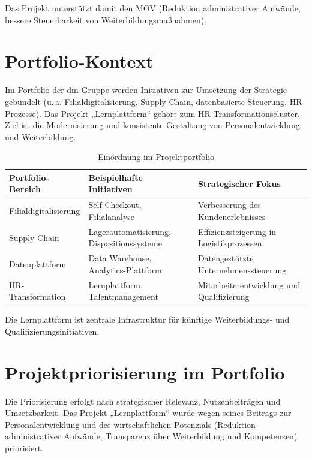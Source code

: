 Das Projekt unterstützt damit den \ac{MOV} (Reduktion administrativer Aufwände, bessere Steuerbarkeit von Weiterbildungsmaßnahmen).

\section{Portfolio-Kontext}

Im Portfolio der dm-Gruppe werden Initiativen zur Umsetzung der Strategie gebündelt (u.\,a. Filialdigitalisierung, Supply Chain, datenbasierte Steuerung, \ac{HR}-Prozesse). Das Projekt „Lernplattform“ gehört zum \ac{HR}-Transformationscluster. Ziel ist die Modernisierung und konsistente Gestaltung von Personalentwicklung und Weiterbildung.

\begin{xltabular}{\textwidth}{@{}lXX@{}}
    \caption{Einordnung im Projektportfolio} \label{tab:portfolio-einordnung} \\
    \hline
    \textbf{Portfolio-Bereich} & \textbf{Beispielhafte Initiativen}        & \textbf{Strategischer Fokus}              \\
    \hline
    Filialdigitalisierung      & Self-Checkout, Filialanalyse              & Verbesserung des Kundenerlebnisses        \\

    Supply Chain               & Lagerautomatisierung, Dispositionssysteme & Effizienzsteigerung in Logistikprozessen  \\

    Datenplattform             & Data Warehouse, Analytics-Plattform       & Datengestützte Unternehmenssteuerung      \\

    \ac{HR}-Transformation      & Lernplattform, Talentmanagement           & Mitarbeiterentwicklung und Qualifizierung \\
    \hline
\end{xltabular}

Die Lernplattform ist zentrale Infrastruktur für künftige Weiterbildungs- und Qualifizierungsinitiativen.

\section{Projektpriorisierung im Portfolio}

Die Priorisierung erfolgt nach strategischer Relevanz, Nutzenbeiträgen und Umsetzbarkeit. Das Projekt „Lernplattform“ wurde wegen seines Beitrags zur Personalentwicklung und des wirtschaftlichen Potenzials (Reduktion administrativer Aufwände, Transparenz über Weiterbildung und Kompetenzen) priorisiert.

